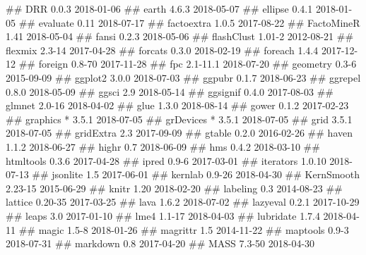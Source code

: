 \documentclass[]{book}
\newenvironment{Shaded}{\begin{snugshade}}{\end{snugshade}}
\newcommand{\NormalTok}[1]{#1}
\theoremstyle{definition}
\theoremstyle{definition}
\theoremstyle{definition}
\theoremstyle{remark}
\begin{document}
\begin{Shaded}
\begin{Highlighting}[]
\NormalTok{##  DRR             0.0.3      2018-01-06}
\NormalTok{##  earth           4.6.3      2018-05-07}
\NormalTok{##  ellipse         0.4.1      2018-01-05}
\NormalTok{##  evaluate        0.11       2018-07-17}
\NormalTok{##  factoextra      1.0.5      2017-08-22}
\NormalTok{##  FactoMineR      1.41       2018-05-04}
\NormalTok{##  fansi           0.2.3      2018-05-06}
\NormalTok{##  flashClust      1.01-2     2012-08-21}
\NormalTok{##  flexmix         2.3-14     2017-04-28}
\NormalTok{##  forcats         0.3.0      2018-02-19}
\NormalTok{##  foreach         1.4.4      2017-12-12}
\NormalTok{##  foreign         0.8-70     2017-11-28}
\NormalTok{##  fpc             2.1-11.1   2018-07-20}
\NormalTok{##  geometry        0.3-6      2015-09-09}
\NormalTok{##  ggplot2         3.0.0      2018-07-03}
\NormalTok{##  ggpubr          0.1.7      2018-06-23}
\NormalTok{##  ggrepel         0.8.0      2018-05-09}
\NormalTok{##  ggsci           2.9        2018-05-14}
\NormalTok{##  ggsignif        0.4.0      2017-08-03}
\NormalTok{##  glmnet          2.0-16     2018-04-02}
\NormalTok{##  glue            1.3.0      2018-08-14}
\NormalTok{##  gower           0.1.2      2017-02-23}
\NormalTok{##  graphics      * 3.5.1      2018-07-05}
\NormalTok{##  grDevices     * 3.5.1      2018-07-05}
\NormalTok{##  grid            3.5.1      2018-07-05}
\NormalTok{##  gridExtra       2.3        2017-09-09}
\NormalTok{##  gtable          0.2.0      2016-02-26}
\NormalTok{##  haven           1.1.2      2018-06-27}
\NormalTok{##  highr           0.7        2018-06-09}
\NormalTok{##  hms             0.4.2      2018-03-10}
\NormalTok{##  htmltools       0.3.6      2017-04-28}
\NormalTok{##  ipred           0.9-6      2017-03-01}
\NormalTok{##  iterators       1.0.10     2018-07-13}
\NormalTok{##  jsonlite        1.5        2017-06-01}
\NormalTok{##  kernlab         0.9-26     2018-04-30}
\NormalTok{##  KernSmooth      2.23-15    2015-06-29}
\NormalTok{##  knitr           1.20       2018-02-20}
\NormalTok{##  labeling        0.3        2014-08-23}
\NormalTok{##  lattice         0.20-35    2017-03-25}
\NormalTok{##  lava            1.6.2      2018-07-02}
\NormalTok{##  lazyeval        0.2.1      2017-10-29}
\NormalTok{##  leaps           3.0        2017-01-10}
\NormalTok{##  lme4            1.1-17     2018-04-03}
\NormalTok{##  lubridate       1.7.4      2018-04-11}
\NormalTok{##  magic           1.5-8      2018-01-26}
\NormalTok{##  magrittr        1.5        2014-11-22}
\NormalTok{##  maptools        0.9-3      2018-07-31}
\NormalTok{##  markdown        0.8        2017-04-20}
\NormalTok{##  MASS            7.3-50     2018-04-30}

\end{Highlighting}
\end{Shaded}
\end{document}
